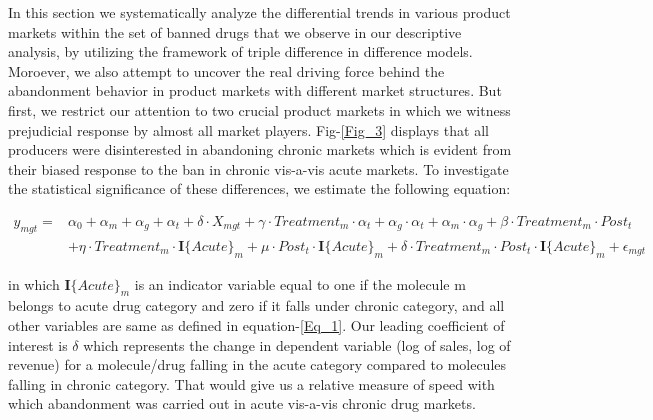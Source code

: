 \documentclass[AER]{AEA}
\theoremstyle{theorem}
\begin{document}
In this section we systematically analyze the differential trends in various product markets within the set of banned drugs that we observe in our descriptive analysis, by utilizing the framework of triple difference in difference models. Moroever, we also attempt to uncover the real driving force behind the abandonment behavior in product markets with different market structures. But first, we restrict our attention to two crucial product markets in which we witness prejudicial response by almost all market players. Fig-\ref{Fig_3} displays that all producers were disinterested in abandoning chronic markets which is evident from their biased response to the ban in chronic vis-a-vis acute markets. To investigate the statistical significance of these differences, we estimate the following equation:

\begin{equation}\label{Eq_3}
	\begin{aligned}
		y_{mgt} =& \alpha_{0} + \alpha_{m}  + \alpha_{g} + \alpha_{t} +  \delta \cdot X_{mgt} +  \gamma \cdot Treatment_{m} \cdot \alpha_{t} + \alpha_{g}\cdot\alpha_{t} + \alpha_{m} \cdot \alpha_{g} + \beta \cdot Treatment_{m} \cdot Post_{t} \\
	&	 + \eta \cdot Treatment_{m} \cdot \mathbf{I}\{Acute\}_{m} + \mu \cdot Post_{t} \cdot \mathbf{I}\{Acute\}_{m} + \delta \cdot Treatment_{m} \cdot Post_{t} \cdot \mathbf{I}\{Acute\}_{m} +  \epsilon_{mgt}
	\end{aligned}
\end{equation}

in which $\mathbf{I}\{Acute\}_{m}$ is an indicator variable equal to one if the molecule m belongs to acute drug category and zero if it falls under chronic category, and all other variables are same as defined in equation-\ref{Eq_1}. Our leading coefficient of interest is $\delta$ which represents the change in dependent variable (log of sales, log of revenue) for a molecule/drug falling in the acute category compared to molecules falling in chronic category. That would give us a relative measure of speed with which abandonment was carried out in acute vis-a-vis chronic drug markets.
\end{document}
